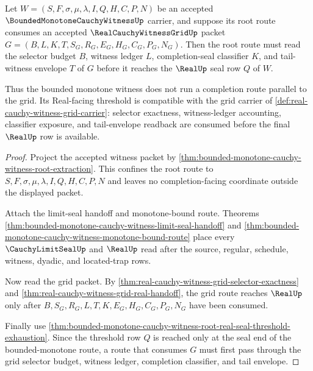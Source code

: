 \begin{theorem}
\label{thm:bounded-monotone-cauchy-witness-grid-route-compatibility}
Let $W=(S,F,\sigma,\mu,\lambda,I,Q,H,C,P,N)$ be an accepted $\BoundedMonotoneCauchyWitnessUp$ carrier, and suppose its root route consumes an accepted $\RealCauchyWitnessGridUp$ packet $G=(B,L,K,T,S_G,R_G,E_G,H_G,C_G,P_G,N_G)$. Then the root route must read the selector budget $B$, witness ledger $L$, completion-seal classifier $K$, and tail-witness envelope $T$ of $G$ before it reaches the $\RealUp$ seal row $Q$ of $W$.

Thus the bounded monotone witness does not run a completion route parallel to the grid. Its Real-facing threshold is compatible with the grid carrier of \autoref{def:real-cauchy-witness-grid-carrier}: selector exactness, witness-ledger accounting, classifier exposure, and tail-envelope readback are consumed before the final $\RealUp$ row is available.
\end{theorem}
\begin{proof}
Project the accepted witness packet by \autoref{thm:bounded-monotone-cauchy-witness-root-extraction}. This confines the root route to $S,F,\sigma,\mu,\lambda,I,Q,H,C,P,N$ and leaves no completion-facing coordinate outside the displayed packet.

Attach the limit-seal handoff and monotone-bound route. Theorems \autoref{thm:bounded-monotone-cauchy-witness-limit-seal-handoff} and \autoref{thm:bounded-monotone-cauchy-witness-monotone-bound-route} place every $\CauchyLimitSealUp$ and $\RealUp$ read after the source, regular, schedule, witness, dyadic, and located-trap rows.

Now read the grid packet. By \autoref{thm:real-cauchy-witness-grid-selector-exactness} and \autoref{thm:real-cauchy-witness-grid-real-handoff}, the grid route reaches $\RealUp$ only after $B,S_G,R_G,L,T,K,E_G,H_G,C_G,P_G,N_G$ have been consumed.

Finally use \autoref{thm:bounded-monotone-cauchy-witness-root-real-seal-threshold-exhaustion}. Since the threshold row $Q$ is reached only at the seal end of the bounded-monotone route, a route that consumes $G$ must first pass through the grid selector budget, witness ledger, completion classifier, and tail envelope.
\end{proof}

